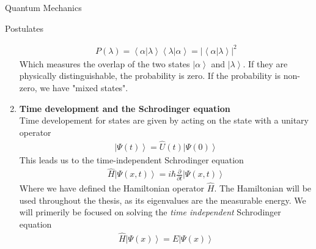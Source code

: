 \documentclass[twoside,english]{uiofysmaster}
\begin{document}
\begin{chapter}{Quantum Mechanics}
\begin{section}{Postulates}
\begin{enumerate}
 			\begin{align}
 				P(\lambda) = \left< \alpha | \lambda \right> \left< \lambda | \alpha \right> = | \left< \alpha | \lambda \right> |^2 
 			\end{align}
 			Which measures the overlap of the two states $\left| \alpha \right>$ and $\left| \lambda \right>$. If they are physically distinguishable, the probability is zero. If the probability is non-zero, we have "mixed states".
 			\item \textbf{Time development and the Schrodinger equation}\\
 			Time developement for states are given by acting on the state with a unitary operator
 			\begin{align}
 				\left| \Psi(t) \right> = \hat U(t) \left| \Psi(0) \right>
 			\end{align}
 			This leads us to the time-independent Schrodinger equation
 			\begin{align}
 				\hat H \left| \Psi(x,t) \right> = i \hbar \frac{\partial}{\partial t} \left| \Psi(x,t) \right> 
 			\end{align}
 			Where we have defined the Hamiltonian operator $\hat H$. The Hamiltonian will be used throughout the thesis, as its eigenvalues are the measurable energy. We will primerily be focused on solving the \textit{time independent} Schrodinger equation
 			\begin{align}
 				\hat H \left| \Psi(x) \right> = E \left| \Psi(x) \right> 
 			\end{align} 
 		\end{enumerate}
 	\end{section}


\end{chapter}
\end{document}
